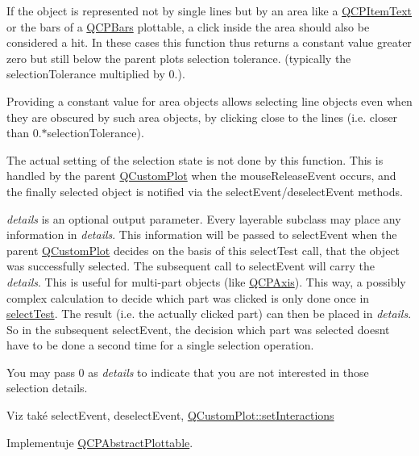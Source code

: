 If the object is represented not by single lines but by an area like a \hyperlink{classQCPItemText}{Q\+C\+P\+Item\+Text} or the bars of a \hyperlink{classQCPBars}{Q\+C\+P\+Bars} plottable, a click inside the area should also be considered a hit. In these cases this function thus returns a constant value greater zero but still below the parent plot\textquotesingle{}s selection tolerance. (typically the selection\+Tolerance multiplied by 0.).

Providing a constant value for area objects allows selecting line objects even when they are obscured by such area objects, by clicking close to the lines (i.\+e. closer than 0.$\ast$selection\+Tolerance).

The actual setting of the selection state is not done by this function. This is handled by the parent \hyperlink{classQCustomPlot}{Q\+Custom\+Plot} when the mouse\+Release\+Event occurs, and the finally selected object is notified via the select\+Event/deselect\+Event methods.

{\itshape details} is an optional output parameter. Every layerable subclass may place any information in {\itshape details}. This information will be passed to select\+Event when the parent \hyperlink{classQCustomPlot}{Q\+Custom\+Plot} decides on the basis of this select\+Test call, that the object was successfully selected. The subsequent call to select\+Event will carry the {\itshape details}. This is useful for multi-\/part objects (like \hyperlink{classQCPAxis}{Q\+C\+P\+Axis}). This way, a possibly complex calculation to decide which part was clicked is only done once in \hyperlink{classQCPBars_a0d37a9feb1d0baf73ce6e809db214445}{select\+Test}. The result (i.\+e. the actually clicked part) can then be placed in {\itshape details}. So in the subsequent select\+Event, the decision which part was selected doesn\textquotesingle{}t have to be done a second time for a single selection operation.

You may pass 0 as {\itshape details} to indicate that you are not interested in those selection details.

\begin{DoxySeeAlso}{Viz také}
select\+Event, deselect\+Event, \hyperlink{classQCustomPlot_a5ee1e2f6ae27419deca53e75907c27e5}{Q\+Custom\+Plot\+::set\+Interactions} 
\end{DoxySeeAlso}


Implementuje \hyperlink{classQCPAbstractPlottable_a1fc81aa273e9e8db84c1056bc0181fdb}{Q\+C\+P\+Abstract\+Plottable}.

